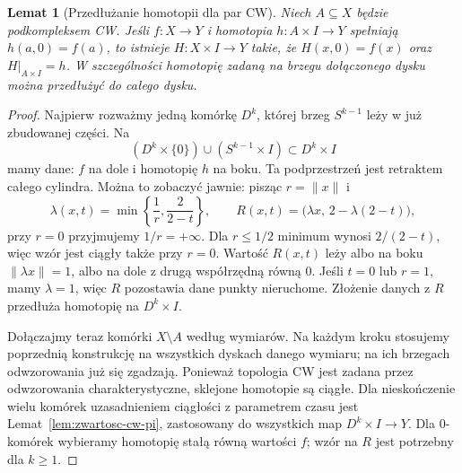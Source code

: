 \documentclass[11pt,a4paper,oneside]{report}
\theoremstyle{plain}
\newtheorem{lemat}[twierdzenie]{Lemat}
\theoremstyle{definition}
\theoremstyle{remark}
\begin{document}
\begin{lemat}[Przedłużanie homotopii dla par CW]
\label{lem:hep-cw}
Niech $A\subseteq X$ będzie podkompleksem
CW. Jeśli $f:X\to Y$ i homotopia
$h:A\times I\to Y$ spełniają
$h(a,0)=f(a)$, to istnieje
$H:X\times I\to Y$ takie, że
$H(x,0)=f(x)$ oraz $H|_{A\times I}=h$.
W szczególności homotopię
zadaną na brzegu dołączonego
dysku można przedłużyć do
całego dysku.
\end{lemat}
\begin{proof}
Najpierw rozważmy jedną komórkę
$D^k$, której brzeg $S^{k-1}$
leży w już zbudowanej części.
Na
\[
 (D^k\times\{0\})\cup
 (S^{k-1}\times I)
\subset D^k\times I
\]
mamy dane: $f$ na dole
i homotopię $h$ na boku.
Ta podprzestrzeń jest
retraktem całego cylindra.
Można to zobaczyć jawnie:
pisząc $r=\|x\|$ i
\[
 \lambda(x,t)=
 \min\left\{\frac1r,\frac2{2-t}\right\},
 \qquad
 R(x,t)=\bigl(\lambda x,\,
                  2-\lambda(2-t)\bigr),
\]
przy $r=0$ przyjmujemy
$1/r=+\infty$. Dla $r\leq1/2$ minimum wynosi $2/(2-t)$,
więc wzór jest ciągły także przy $r=0$. Wartość
$R(x,t)$ leży albo na boku
$\|\lambda x\|=1$, albo
na dole z drugą współrzędną
równą $0$. Jeśli $t=0$
lub $r=1$, mamy $\lambda=1$,
więc $R$ pozostawia dane
punkty nieruchome.
Złożenie danych z $R$
przedłuża homotopię
na $D^k\times I$.

Dołączajmy teraz komórki
$X\setminus A$ według
wymiarów. Na każdym kroku
stosujemy poprzednią
konstrukcję na wszystkich
dyskach danego wymiaru;
na ich brzegach odwzorowania
już się zgadzają. Ponieważ
topologia CW jest zadana
przez odwzorowania charakterystyczne,
sklejone homotopie są
ciągłe. Dla nieskończenie wielu komórek uzasadnieniem ciągłości
z parametrem czasu jest Lemat~\ref{lem:zwartosc-cw-pi},
zastosowany do wszystkich map $D^k\times I\to Y$.
Dla $0$-komórek wybieramy homotopię stałą równą wartości $f$;
wzór na $R$ jest potrzebny dla $k\geq1$.
\end{proof}
\end{document}
